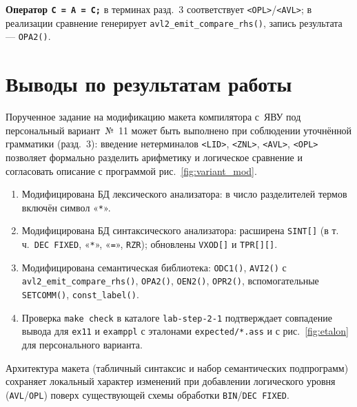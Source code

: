 \documentclass[a4paper,14pt]{extarticle}
\begin{document}
\textbf{Оператор \texttt{C = A = C;}} в терминах разд.~3 соответствует \texttt{<OPL>}/\texttt{<AVL>}; в реализации сравнение генерирует
\texttt{avl2\_emit\_compare\_rhs()}, запись результата --- \texttt{OPA2()}.

\section{Выводы по результатам работы}

Порученное задание на модификацию макета компилятора с~ЯВУ под персональный вариант~№~11 может быть выполнено при соблюдении
уточнённой грамматики (разд.~3): введение нетерминалов \texttt{<LID>}, \texttt{<ZNL>}, \texttt{<AVL>}, \texttt{<OPL>} позволяет
формально разделить арифметику и логическое сравнение и согласовать описание с программой рис.~\ref{fig:variant_mod}.

\begin{enumerate}
  \item Модифицирована БД лексического анализатора: в число разделителей термов включён символ «\texttt{*}».

  \item Модифицирована БД синтаксического анализатора: расширена \texttt{SINT[]} (в т.\,ч.\ \texttt{DEC FIXED}, «\texttt{*}», «\texttt{=}»,
        \texttt{RZR}); обновлены \texttt{VXOD[]} и \texttt{TPR[][]}.

  \item Модифицирована семантическая библиотека: \texttt{ODC1()}, \texttt{AVI2()} с \texttt{avl2\_emit\_compare\_rhs()}, \texttt{OPA2()},
        \texttt{OEN2()}, \texttt{OPR2()}, вспомогательные \texttt{SETCOMM()}, \texttt{const\_label()}.

  \item Проверка \texttt{make check} в каталоге \texttt{lab-step-2-1} подтверждает совпадение вывода для \texttt{ex11} и \texttt{examppl}
        с эталонами \texttt{expected/*.ass} и с рис.~\ref{fig:etalon} для персонального варианта.
\end{enumerate}

Архитектура макета (табличный синтаксис и набор семантических подпрограмм) сохраняет локальный характер изменений при добавлении
логического уровня (\texttt{AVL}/\texttt{OPL}) поверх существующей схемы обработки \texttt{BIN}/\texttt{DEC FIXED}.
\end{document}
